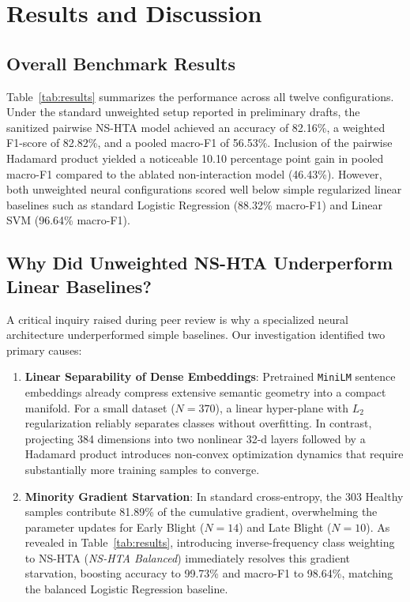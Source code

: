 \documentclass[conference]{IEEEtran}
\begin{document}
\section{Results and Discussion}

\subsection{Overall Benchmark Results}
Table~\ref{tab:results} summarizes the performance across all twelve configurations. Under the standard unweighted setup reported in preliminary drafts, the sanitized pairwise NS-HTA model achieved an accuracy of 82.16\%, a weighted F1-score of 82.82\%, and a pooled macro-F1 of 56.53\%. Inclusion of the pairwise Hadamard product yielded a noticeable 10.10 percentage point gain in pooled macro-F1 compared to the ablated non-interaction model (46.43\%). However, both unweighted neural configurations scored well below simple regularized linear baselines such as standard Logistic Regression (88.32\% macro-F1) and Linear SVM (96.64\% macro-F1).

\subsection{Why Did Unweighted NS-HTA Underperform Linear Baselines?}
A critical inquiry raised during peer review is why a specialized neural architecture underperformed simple baselines. Our investigation identified two primary causes:
\begin{enumerate}
    \item \textbf{Linear Separability of Dense Embeddings}: Pretrained \texttt{MiniLM} sentence embeddings already compress extensive semantic geometry into a compact manifold. For a small dataset ($N=370$), a linear hyper-plane with $L_2$ regularization reliably separates classes without overfitting. In contrast, projecting 384 dimensions into two nonlinear 32-d layers followed by a Hadamard product introduces non-convex optimization dynamics that require substantially more training samples to converge.
    \item \textbf{Minority Gradient Starvation}: In standard cross-entropy, the 303 Healthy samples contribute 81.89\% of the cumulative gradient, overwhelming the parameter updates for Early Blight ($N=14$) and Late Blight ($N=10$). As revealed in Table~\ref{tab:results}, introducing inverse-frequency class weighting to NS-HTA (\textit{NS-HTA Balanced}) immediately resolves this gradient starvation, boosting accuracy to 99.73\% and macro-F1 to 98.64\%, matching the balanced Logistic Regression baseline.
\end{enumerate}
\end{document}
